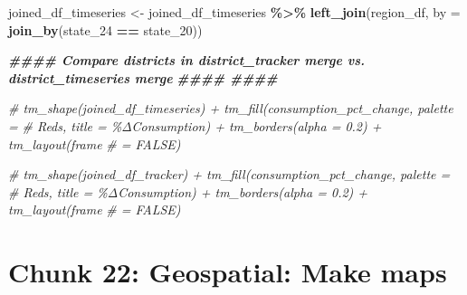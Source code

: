 \documentclass[
]{article}
\newenvironment{Shaded}{\begin{snugshade}}{\end{snugshade}}
\newcommand{\AttributeTok}[1]{\textcolor[rgb]{0.13,0.29,0.53}{#1}}
\newcommand{\CommentTok}[1]{\textcolor[rgb]{0.56,0.35,0.01}{\textit{#1}}}
\newcommand{\DocumentationTok}[1]{\textcolor[rgb]{0.56,0.35,0.01}{\textbf{\textit{#1}}}}
\newcommand{\FunctionTok}[1]{\textcolor[rgb]{0.13,0.29,0.53}{\textbf{#1}}}
\newcommand{\NormalTok}[1]{#1}
\newcommand{\OtherTok}[1]{\textcolor[rgb]{0.56,0.35,0.01}{#1}}
\newcommand{\SpecialCharTok}[1]{\textcolor[rgb]{0.81,0.36,0.00}{\textbf{#1}}}
\begin{document}
\begin{Shaded}
\begin{Highlighting}[]
\NormalTok{joined\_df\_timeseries }\OtherTok{\textless{}{-}}\NormalTok{ joined\_df\_timeseries }\SpecialCharTok{\%\textgreater{}\%}
    \FunctionTok{left\_join}\NormalTok{(region\_df, }\AttributeTok{by =} \FunctionTok{join\_by}\NormalTok{(state\_24 }\SpecialCharTok{==}\NormalTok{ state\_20))}



\DocumentationTok{\#\#\#\# Compare districts in district\_tracker merge vs. district\_timeseries merge}
\DocumentationTok{\#\#\#\# \#\#\#\#}

\CommentTok{\# tm\_shape(joined\_df\_timeseries) + tm\_fill(\textquotesingle{}consumption\_pct\_change\textquotesingle{}, palette =}
\CommentTok{\# \textquotesingle{}Reds\textquotesingle{}, title = \textquotesingle{}\%ΔConsumption\textquotesingle{}) + tm\_borders(alpha = 0.2) + tm\_layout(frame}
\CommentTok{\# = FALSE)}

\CommentTok{\# tm\_shape(joined\_df\_tracker) + tm\_fill(\textquotesingle{}consumption\_pct\_change\textquotesingle{}, palette =}
\CommentTok{\# \textquotesingle{}Reds\textquotesingle{}, title = \textquotesingle{}\%ΔConsumption\textquotesingle{}) + tm\_borders(alpha = 0.2) + tm\_layout(frame}
\CommentTok{\# = FALSE)}
\end{Highlighting}
\end{Shaded}

\section*{Chunk 22: Geospatial: Make maps}\label{chunk-22-geospatial-make-maps}
\end{document}
